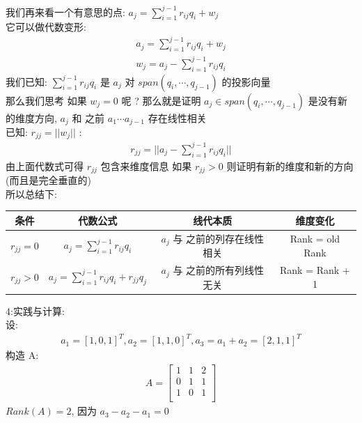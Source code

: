 \documentclass[12pt]{article}
\begin{document}
\begin{flushleft}
    我们再来看一个有意思的点: $ a_{j} = \sum_{i = 1}^{j - 1}r_{ij}q_{i} + w_{j}$ \\
    它可以做代数变形: \\
    \begin{align}
        a_{j} = \sum_{i = 1}^{j - 1}r_{ij}q_{i} + w_{j} \\
        w_{j} = a_{j} - \sum_{i = 1}^{j - 1}r_{ij}q_{i}
    \end{align}
    我们已知: $\sum_{i = 1}^{j - 1}r_{ij}q_{i}$ 是 $a_{j}$ 对 $span(q_{i}, \cdots , q_{j -1})$ 的投影向量 \\
    那么我们思考 如果 $w_{j} = 0$ 呢 ? 那么就是证明 $a_{j} \in span(q_{i}, \cdots , q_{j -1})$ 是没有新的维度方向,
    $a_{j}$ 和 之前 $a_{1} \cdots a_{j-1}$ 存在线性相关  \\
    已知: $r_{jj} = ||w_{j}||$ :\\
    \begin{align}
        r_{jj} = ||a_{j} - \sum_{i = 1}^{j - 1}r_{ij}q_{i}||
    \end{align}
    由上面代数式可得 $r_{jj}$ 包含来维度信息 如果 $r_{jj} > 0$ 则证明有新的维度和新的方向(而且是完全垂直的) \\
    所以总结下: \\
    \begin{tabular}{|c|c|c|c|}
        \hline
        条件           & 代数公式                                                    & 线代本质                 & 维度变化            \\
        \hline
        $r_{jj} = 0$ & $a_{j} = \sum_{i = 1}^{j - 1}r_{ij}q_{i}$               & $a_{j}$ 与 之前的列存在线性相关 & Rank = old Rank \\
        \hline
        $r_{jj} > 0$ & $a_{j} = \sum_{i = 1}^{j - 1}r_{ij}q_{i} + r_{jj}q_{j}$ & $a_{j}$ 与 之前的所有列线性无关 & Rank = Rank + 1 \\
        \hline
    \end{tabular}

    4:实践与计算: \\
    设: \\
    \begin{align}
        a_{1} = [1, 0, 1]^{T}, a_{2} = [1, 1, 0]^{T}, a_{3} = a_{1}+ a_{2} = [2, 1, 1]^{T}
    \end{align}
    构造 A:
    \begin{align}
        A = \begin{bmatrix}
                1 & 1 & 2 \\
                0 & 1 & 1 \\
                1 & 0 & 1 \\
            \end{bmatrix}
    \end{align}
    $Rank(A) = 2$, 因为 $ a_{3} - a_{2} - a_{1} = 0 $ \\


\end{flushleft}
\end{document}
